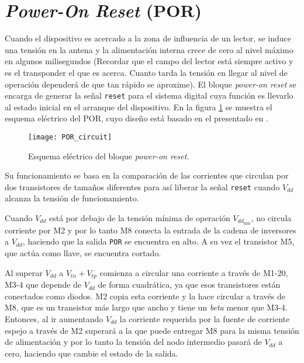\section{\emph{Power-On Reset} (POR)}

Cuando el dispositivo es acercado a la zona de influencia de un 
lector, se induce una tensión en la antena y la alimentación interna 
crece de cero al nivel máximo en algunos milisegundos (Recordar que el 
campo del lector está siempre activo y es el transponder el que es 
acerca. Cuanto tarda la tensión en llegar al nivel de operación 
dependerá de que tan rápido se aproxime). 
El bloque \emph{power-on reset} se encarga de generar la señal 
\lstinline{reset} para el sistema digital cuya función es llevarlo 
al estado inicial en el arranque del dispositivo. En la figura 
\ref{fig:PORCircuit} se muestra el esquema eléctrico del POR, cuyo 
diseño está basado en el presentado en \cite{Gudnason}.

\begin{figure}
	\centering
	\texttt{[image: POR\_circuit]}
	\caption{Esquema eléctrico del bloque \emph{power-on reset}.}
	\label{fig:PORCircuit}
\end{figure}

Su funcionamiento se basa en la comparación de las corrientes que 
circulan por dos transistores de tamaños diferentes para así liberar 
la señal \lstinline{reset} cuando \(V_{dd}\) alcanza la tensión de 
funcionamiento.

Cuando \(V_{dd}\) está por debajo de la tensión mínima de operación 
\(V_{dd_{\text{mín}}}\), no circula corriente por M2 y por lo tanto M8 
conecta la entrada de la cadena de inversores a \(V_{dd}\), haciendo 
que la salida \lstinline{POR} se encuentra en alto. A su vez el 
transistor M5, que actúa como llave, se encuentra cortado.

Al superar \(V_{dd}\) a \(V_{tn}+V_{tp}\) comienza 
a circular una corriente a través de M1-20, M3-4 que depende de \(
V_{dd}\) de forma cuadrática, ya que esos transistores están 
conectados como diodos. M2 copia esta corriente y la hace circular a 
través de M8, que es un transistor más largo que ancho y tiene un 
\emph{beta} menor que M3-4. Entonces, al ir aumentando \(V_{dd}\) la 
corriente requerida por la fuente de corriente espejo a través de M2 
superará a la que puede entregar M8 para la misma tensión de 
alimentación y por lo tanto la tensión del nodo intermedio pasará de 
\(V_{dd}\) a cero, haciendo que cambie el estado de la salida.

